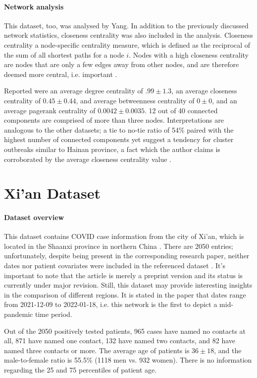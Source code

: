 \paragraph{Network analysis} This dataset, too, was analysed by Yang. In addition to the previously discussed network statistics, closeness centrality was also included in the analysis. Closeness centrality a node-specific centrality measure, which is defined as the reciprocal of the sum of all shortest paths for a node $i$. Nodes with a high closeness centrality are nodes that are only a few edges away from other nodes, and are therefore deemed more central, i.e. important \cite{sabidussi1966centrality}. 

Reported were an average degree centrality of $.99\pm1.3$, an average closeness centrality of $0.45\pm0.44$, and average betweenness centrality of $0\pm0$, and an average pagerank centrality of $0.0042\pm0.0035$. 12 out of 40 connected components are comprised of more than three nodes. Interpretations are analogous to the other datasets; a tie to no-tie ratio of 54\% paired with the highest number of connected components yet suggest a tendency for cluster outbreaks similar to Hainan province, a fact which the author claims is corroborated by the average closeness centrality value \cite{shaanxi_publication}.

\section{Xi'an Dataset}
\label{sec:xian_data}

\paragraph{Dataset overview} This dataset contains COVID case information from the city of Xi'an, which is located in the Shaanxi province in northern China \cite{xian_data}. There are 2050 entries; unfortunately, despite being present in the corresponding research paper, neither dates nor patient covariates were included in the referenced dataset \cite{xian_publication,xian_data}. It's important to note that the article is merely a preprint version and its status is currently under major revision. Still, this dataset may provide interesting insights in the comparison of different regions. It is stated in the paper that dates range from 2021-12-09 to 2022-01-18, i.e. this network is the first to depict a mid-pandemic time period. 

Out of the 2050 positively tested patients, 965 cases have named no contacts at all, 871 have named one contact, 132 have named two contacts, and 82 have named three contacts or more. The average age of patients is $36\pm18$, and the male-to-female ratio is 55.5\% (1118 men vs. 932 women). There is no information regarding the 25 and 75 percentiles of patient age. 

